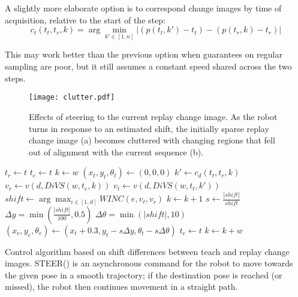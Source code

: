 \documentclass[twocolumn, 9pt,fleqn]{jsproceedings}
\begin{document}
A slightly more elaborate option is to correspond change images by time of acquisition, relative to the start of the step:
\begin{equation}
c_t(t_t, t_r, k) = \arg \min_{k' \in [1, n]} {| (p(t_t, k') - t_t) - (p(t_r, k) - t_r) |}
\end{equation}

This may work better than the previous option when guarantees on regular sampling are poor, but it still assumes a constant speed shared across the two steps.

\begin{figure}[h!]
\centering
\texttt{[image: clutter.pdf]}
\caption{Effects of steering to the current replay change image. As the robot turns in response to an estimated shift, the initially sparse replay change image (a) becomes cluttered with changing regions that fell out of alignment with the current sequence (b).}
\label{fig:clutter}
\end{figure}

\begin{algorithm}
\begin{algorithmic}
\State $t_r \gets t$ 
\State $t_e \gets t$
\State $k \gets w$
\State $(x_t, y_t, \theta_t) \gets (0, 0, 0)$ 
\State {} 
\Repeat
    \State {} 
    \State $k' \gets c_d(t_t, t_r, k)$
    \State $v_r \gets v(d, DiVS(w, t_e, k))$
    \State $v_t \gets v(d, DiVS(w, t_t, k'))$
    \State $shift \gets \arg \max_{i \in [1, d]}{WINC(e, v_t, v_r)}$
        \State $k \gets k + 1$
    \Else
        \State $s \gets \frac{|shift|}{shift}$ 
        \State $\Delta y = \min{(\frac{|shift|}{100}, 0.5)}$
        \State $\Delta \theta = \min{(|shift|, 10)}$
        \State $(x_e, y_e, \theta_e) \gets (x_t + 0.3, y_t - s \Delta y, \theta_t - s \Delta \theta)$
        \State {} 
        \State {}
        \State $t_e \gets t$
        \State $k \gets k + w$
    \EndIf
{}
\end{algorithmic}
\caption{Control algorithm based on shift differences between teach and replay change images. STEER() is an asynchronous command for the robot to move towards the given pose in a smooth trajectory; if the destination pose is reached (or missed), the robot then continues movement in a straight path.}
\label{alg:control}
\end{algorithm}
\end{document}
